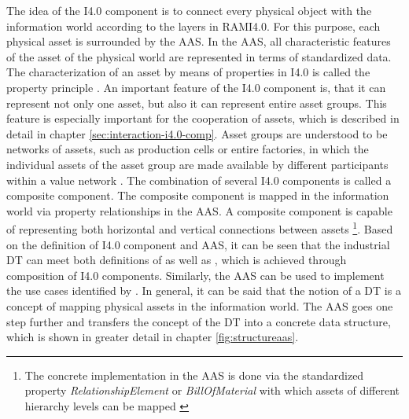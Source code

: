 The idea of the \ac{I4.0} component is to connect every physical object with the information world according to the layers in \ac{RAMI4.0}. For this purpose, each physical asset is surrounded by the \ac{AAS}. In the \ac{AAS}, all characteristic features of the asset of the physical world are represented in terms of standardized data. The characterization of an asset by means of properties in \ac{I4.0} is called the property principle \cite[p. 17]{Heidel2017ReferenzarchitekturmodellIndustrie4.0Komponente}. An important feature of the \ac{I4.0} component is, that it can represent not only one asset, but also it can represent entire asset groups. This feature is especially important for the cooperation of assets, which is described in detail in chapter \ref{sec:interaction-i4.0-comp}. Asset groups are understood to be networks of assets, such as production cells or entire factories, in which the individual assets of the asset group are made available by different participants within a value network \cite[p. 11]{Bedenbender2017BeziehungenProduktion}. The combination of several \ac{I4.0} components is called a composite component. The composite component is mapped in the information world via property relationships in the \ac{AAS}. A composite component is capable of representing both horizontal and vertical connections between assets \cite[p. 13]{Bedenbender2017BeziehungenProduktion} \footnote{The concrete implementation in the \ac{AAS} is done via the standardized property \textit{RelationshipElement} or \textit{BillOfMaterial} with which assets of different hierarchy levels can be mapped \cite[p. 32]{Bader2020Details3.0RC01}}.  Based on the definition of \ac{I4.0} component and \ac{AAS}, it can be seen that the industrial \ac{DT} can meet both definitions of \citet{Rosen2015AboutManufacturing} as well as \citet{Schluse2016FromSystems}, which is achieved through composition of \ac{I4.0} components. Similarly, the \ac{AAS} can be used to implement the use cases identified by \citet{Son2021PastManufacturing}. In general, it can be said that the notion of a \ac{DT} is a concept of mapping physical assets in the information world. The \ac{AAS} goes one step further and transfers the concept of the \ac{DT} into a concrete data structure, which is shown in greater detail in chapter \ref{fig:structureaas}.

